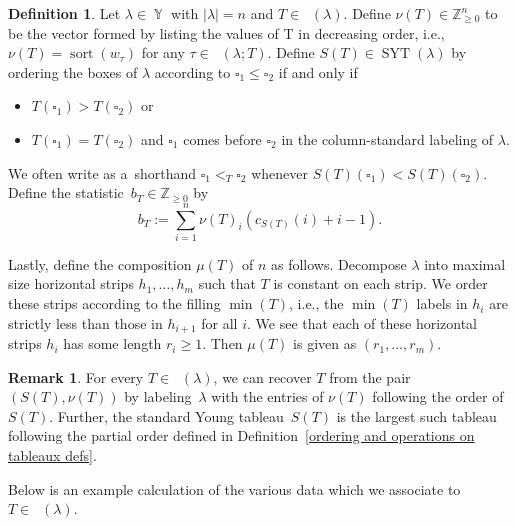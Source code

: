 \documentclass[pdftex]{sigma}
\numberwithin{equation}{section}
\theoremstyle{definition}
\newtheorem{Definition}[Theorem]{Definition}
\newtheorem{Remark}[Theorem]{Remark}
\DeclareMathOperator{\Par}{\mathbb{Y}}
\DeclareMathOperator{\RYT}{\mathrm{RYT}_{\geq 0}}
\DeclareMathOperator{\SYT}{\mathrm{SYT}}
\DeclareMathOperator{\PSYT}{\mathrm{PSYT}_{\geq 0}}
\DeclareMathOperator{\sort}{sort}
\DeclareMathOperator{\Min}{\mathrm{min}}
\begin{document}
\begin{Definition}\label{decomposing RYT into SYT and partition}
Let $\lambda \in \Par$ with $|\lambda| = n$ and $T \in \RYT(\lambda)$. Define $\nu(T) \in \mathbb{Z}_{\geq 0}^{n}$ to be the vector formed by listing the values of T in decreasing order, i.e., $\nu(T) = \sort(w_{\tau})$ for any $\tau \in \PSYT(\lambda;T)$. Define $S(T) \in \SYT(\lambda)$ by ordering the boxes of $\lambda$ according to $\square_1 \leq \square_2$ if and only if
\begin{itemize}
\itemsep=0pt
 \item $T(\square_1) > T(\square_2)$ or
 \item $T(\square_1) = T(\square_2)$ and $\square_1$ comes before $\square_2$ in the column-standard labeling of $\lambda$.
\end{itemize}
We often write as a~shorthand $\square_1 <_{T} \square_2$ whenever $S(T)(\square_1) < S(T)(\square_2)$.
Define the statistic~${b_T \in \mathbb{Z}_{\geq 0}}$ by
\[
b_T:= \sum_{i=1}^{n} \nu(T)_i( c_{S(T)}(i) + i-1).
\]

Lastly, define the composition $\mu(T)$ of $n$ as follows. Decompose $\lambda$ into maximal size horizontal strips $h_1,\dots, h_m$ such that $T$ is constant on each strip. We order these strips according to the filling $\Min(T)$, i.e., the $\Min(T)$ labels in $h_i$ are strictly less than those in $h_{i+1}$ for all $i$. We see that each of these horizontal strips $h_i$ has some length $r_i\geq 1$. Then $\mu(T)$ is given as $(r_1,\dots, r_m)$.
\end{Definition}

\begin{Remark}
 For every $T \in \RYT(\lambda)$, we can recover $T$ from the pair $(S(T),\nu(T))$ by labeling~$\lambda$ with the entries of $\nu(T)$ following the order of $S(T)$. Further, the standard Young tableau~$S(T)$ is the largest such tableau following the partial order defined in Definition~\ref{ordering and operations on tableaux defs}.
\end{Remark}

Below is an example calculation of the various data which we associate to $T \in \RYT(\lambda)$.
\end{document}
